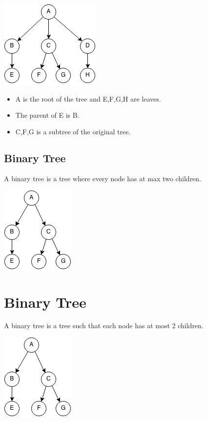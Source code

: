 \documentclass[11pt,oneside]{book}
\makeatletter
\def\maxwidth#1{\ifdim\Gin@nat@width>#1 #1\else\Gin@nat@width\fi}
\makeatother
\begin{document}
\includegraphics[width=\maxwidth{\textwidth}]{tree.png}

\begin{itemize}
\item A is the root of the tree and E,F,G,H are leaves. 
\item The parent of E is B. 
\item C,F,G is a subtree of the original tree.
\end{itemize}

\subsection{Binary Tree}

A binary tree is a tree where every node has at max two children.

\includegraphics[width=\maxwidth{\textwidth}]{binarytree.png}
\section{Binary Tree}

A binary tree is a tree such that each node has at most 2 children.

\includegraphics[width=\maxwidth{\textwidth}]{binarytree.png}
\end{document}
